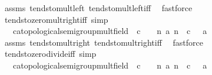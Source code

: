 \begin{isabellebody}
%
\isatagproof
{}\isamarkupfalse%
\ assms\ tendsto{\isacharunderscore}{\kern0pt}mult{\isacharunderscore}{\kern0pt}left\ tendsto{\isacharunderscore}{\kern0pt}mult{\isacharunderscore}{\kern0pt}left{\isacharunderscore}{\kern0pt}iff\ \isamarkupfalse%
\ fastforce%
\endisatagproof
{\isafoldproof}%
%
\isadelimproof
\isanewline
%
\endisadelimproof
\isanewline
{}\isamarkupfalse%
\ tendsto{\isacharunderscore}{\kern0pt}zero{\isacharunderscore}{\kern0pt}mult{\isacharunderscore}{\kern0pt}right{\isacharunderscore}{\kern0pt}iff\ {\isacharbrackleft}{\kern0pt}simp{\isacharbrackright}{\kern0pt}{\isacharcolon}{\kern0pt}\isanewline
\ \ \ c{\isacharcolon}{\kern0pt}{\isacharcolon}{\kern0pt}{\isachardoublequoteopen}{\isacharprime}{\kern0pt}a{\isacharcolon}{\kern0pt}{\isacharcolon}{\kern0pt}{\isacharbraceleft}{\kern0pt}topological{\isacharunderscore}{\kern0pt}semigroup{\isacharunderscore}{\kern0pt}mult{\isacharcomma}{\kern0pt}field{\isacharbraceright}{\kern0pt}{\isachardoublequoteclose}\ \ {\isachardoublequoteopen}c\ {\isasymnoteq}\ {}{\isachardoublequoteclose}\ \ {\isachardoublequoteopen}{\isacharparenleft}{\kern0pt}{\isasymlambda}n{\isachardot}{\kern0pt}\ a\ n\ {\isacharasterisk}{\kern0pt}\ c{\isacharparenright}{\kern0pt}{\isasymlonglonglongrightarrow}\ {}\ {\isasymlongleftrightarrow}\ a\ {\isasymlonglonglongrightarrow}\ {}{\isachardoublequoteclose}\isanewline
%
\isadelimproof
\ \ %
\endisadelimproof
%
\isatagproof
{}\isamarkupfalse%
\ assms\ tendsto{\isacharunderscore}{\kern0pt}mult{\isacharunderscore}{\kern0pt}right\ tendsto{\isacharunderscore}{\kern0pt}mult{\isacharunderscore}{\kern0pt}right{\isacharunderscore}{\kern0pt}iff\ \isamarkupfalse%
\ fastforce%
\endisatagproof
{\isafoldproof}%
%
\isadelimproof
\isanewline
%
\endisadelimproof
\isanewline
{}\isamarkupfalse%
\ tendsto{\isacharunderscore}{\kern0pt}zero{\isacharunderscore}{\kern0pt}divide{\isacharunderscore}{\kern0pt}iff\ {\isacharbrackleft}{\kern0pt}simp{\isacharbrackright}{\kern0pt}{\isacharcolon}{\kern0pt}\isanewline
\ \ \ c{\isacharcolon}{\kern0pt}{\isacharcolon}{\kern0pt}{\isachardoublequoteopen}{\isacharprime}{\kern0pt}a{\isacharcolon}{\kern0pt}{\isacharcolon}{\kern0pt}{\isacharbraceleft}{\kern0pt}topological{\isacharunderscore}{\kern0pt}semigroup{\isacharunderscore}{\kern0pt}mult{\isacharcomma}{\kern0pt}field{\isacharbraceright}{\kern0pt}{\isachardoublequoteclose}\ \ {\isachardoublequoteopen}c\ {\isasymnoteq}\ {}{\isachardoublequoteclose}\ \ {\isachardoublequoteopen}{\isacharparenleft}{\kern0pt}{\isasymlambda}n{\isachardot}{\kern0pt}\ a\ n\ {\isacharslash}{\kern0pt}\ c{\isacharparenright}{\kern0pt}{\isasymlonglonglongrightarrow}\ {}\ {\isasymlongleftrightarrow}\ a\ {\isasymlonglonglongrightarrow}\ {}{\isachardoublequoteclose}\isanewline

\end{isabellebody}
